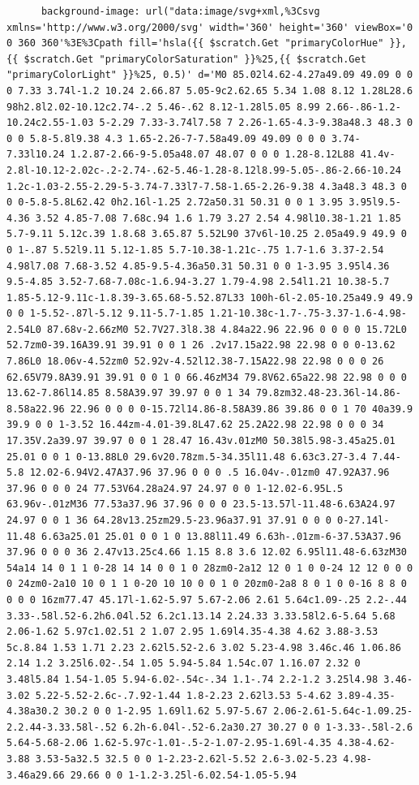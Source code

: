 \documentclass[11pt]{article}
\begin{document}
\begin{enumerate}
\begin{verbatim}
      background-image: url("data:image/svg+xml,%3Csvg xmlns='http://www.w3.org/2000/svg' width='360' height='360' viewBox='0 0 360 360'%3E%3Cpath fill='hsla({{ $scratch.Get "primaryColorHue" }},{{ $scratch.Get "primaryColorSaturation" }}%25,{{ $scratch.Get "primaryColorLight" }}%25, 0.5)' d='M0 85.02l4.62-4.27a49.09 49.09 0 0 0 7.33 3.74l-1.2 10.24 2.66.87 5.05-9c2.62.65 5.34 1.08 8.12 1.28L28.6 98h2.8l2.02-10.12c2.74-.2 5.46-.62 8.12-1.28l5.05 8.99 2.66-.86-1.2-10.24c2.55-1.03 5-2.29 7.33-3.74l7.58 7 2.26-1.65-4.3-9.38a48.3 48.3 0 0 0 5.8-5.8l9.38 4.3 1.65-2.26-7-7.58a49.09 49.09 0 0 0 3.74-7.33l10.24 1.2.87-2.66-9-5.05a48.07 48.07 0 0 0 1.28-8.12L88 41.4v-2.8l-10.12-2.02c-.2-2.74-.62-5.46-1.28-8.12l8.99-5.05-.86-2.66-10.24 1.2c-1.03-2.55-2.29-5-3.74-7.33l7-7.58-1.65-2.26-9.38 4.3a48.3 48.3 0 0 0-5.8-5.8L62.42 0h2.16l-1.25 2.72a50.31 50.31 0 0 1 3.95 3.95l9.5-4.36 3.52 4.85-7.08 7.68c.94 1.6 1.79 3.27 2.54 4.98l10.38-1.21 1.85 5.7-9.11 5.12c.39 1.8.68 3.65.87 5.52L90 37v6l-10.25 2.05a49.9 49.9 0 0 1-.87 5.52l9.11 5.12-1.85 5.7-10.38-1.21c-.75 1.7-1.6 3.37-2.54 4.98l7.08 7.68-3.52 4.85-9.5-4.36a50.31 50.31 0 0 1-3.95 3.95l4.36 9.5-4.85 3.52-7.68-7.08c-1.6.94-3.27 1.79-4.98 2.54l1.21 10.38-5.7 1.85-5.12-9.11c-1.8.39-3.65.68-5.52.87L33 100h-6l-2.05-10.25a49.9 49.9 0 0 1-5.52-.87l-5.12 9.11-5.7-1.85 1.21-10.38c-1.7-.75-3.37-1.6-4.98-2.54L0 87.68v-2.66zM0 52.7V27.3l8.38 4.84a22.96 22.96 0 0 0 0 15.72L0 52.7zm0-39.16A39.91 39.91 0 0 1 26 .2v17.15a22.98 22.98 0 0 0-13.62 7.86L0 18.06v-4.52zm0 52.92v-4.52l12.38-7.15A22.98 22.98 0 0 0 26 62.65V79.8A39.91 39.91 0 0 1 0 66.46zM34 79.8V62.65a22.98 22.98 0 0 0 13.62-7.86l14.85 8.58A39.97 39.97 0 0 1 34 79.8zm32.48-23.36l-14.86-8.58a22.96 22.96 0 0 0 0-15.72l14.86-8.58A39.86 39.86 0 0 1 70 40a39.9 39.9 0 0 1-3.52 16.44zm-4.01-39.8L47.62 25.2A22.98 22.98 0 0 0 34 17.35V.2a39.97 39.97 0 0 1 28.47 16.43v.01zM0 50.38l5.98-3.45a25.01 25.01 0 0 1 0-13.88L0 29.6v20.78zm.5-34.35l11.48 6.63c3.27-3.4 7.44-5.8 12.02-6.94V2.47A37.96 37.96 0 0 0 .5 16.04v-.01zm0 47.92A37.96 37.96 0 0 0 24 77.53V64.28a24.97 24.97 0 0 1-12.02-6.95L.5 63.96v-.01zM36 77.53a37.96 37.96 0 0 0 23.5-13.57l-11.48-6.63A24.97 24.97 0 0 1 36 64.28v13.25zm29.5-23.96a37.91 37.91 0 0 0 0-27.14l-11.48 6.63a25.01 25.01 0 0 1 0 13.88l11.49 6.63h-.01zm-6-37.53A37.96 37.96 0 0 0 36 2.47v13.25c4.66 1.15 8.8 3.6 12.02 6.95l11.48-6.63zM30 54a14 14 0 1 1 0-28 14 14 0 0 1 0 28zm0-2a12 12 0 1 0 0-24 12 12 0 0 0 0 24zm0-2a10 10 0 1 1 0-20 10 10 0 0 1 0 20zm0-2a8 8 0 1 0 0-16 8 8 0 0 0 0 16zm77.47 45.17l-1.62-5.97 5.67-2.06 2.61 5.64c1.09-.25 2.2-.44 3.33-.58l.52-6.2h6.04l.52 6.2c1.13.14 2.24.33 3.33.58l2.6-5.64 5.68 2.06-1.62 5.97c1.02.51 2 1.07 2.95 1.69l4.35-4.38 4.62 3.88-3.53 5c.8.84 1.53 1.71 2.23 2.62l5.52-2.6 3.02 5.23-4.98 3.46c.46 1.06.86 2.14 1.2 3.25l6.02-.54 1.05 5.94-5.84 1.54c.07 1.16.07 2.32 0 3.48l5.84 1.54-1.05 5.94-6.02-.54c-.34 1.1-.74 2.2-1.2 3.25l4.98 3.46-3.02 5.22-5.52-2.6c-.7.92-1.44 1.8-2.23 2.62l3.53 5-4.62 3.89-4.35-4.38a30.2 30.2 0 0 1-2.95 1.69l1.62 5.97-5.67 2.06-2.61-5.64c-1.09.25-2.2.44-3.33.58l-.52 6.2h-6.04l-.52-6.2a30.27 30.27 0 0 1-3.33-.58l-2.6 5.64-5.68-2.06 1.62-5.97c-1.01-.5-2-1.07-2.95-1.69l-4.35 4.38-4.62-3.88 3.53-5a32.5 32.5 0 0 1-2.23-2.62l-5.52 2.6-3.02-5.23 4.98-3.46a29.66 29.66 0 0 1-1.2-3.25l-6.02.54-1.05-5.94 
\end{verbatim}
\end{enumerate}
\end{document}
